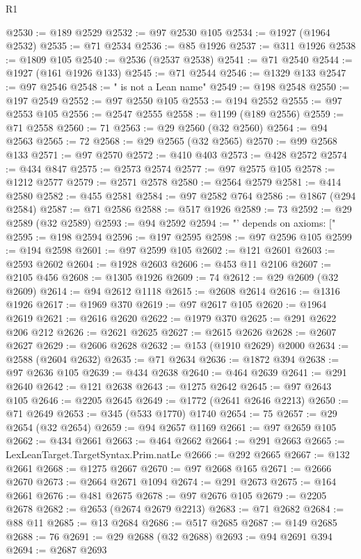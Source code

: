 \begin{lexlean}{R1}
\begin{coremodule}
{{{{{{{{{{{{{{{{{{{{{{{{{{{{{{{{{{{{{{{{{{{{{{{{{{{{{{{{{{{{{{{{{{{{{{{{{{{{{{{{{{{{{{{{{{{{{{{{{{{{{{{{{{{{{{{{{{{{{{{{{{{{{{{{{{{{{{{{{{{{{{{{{{{{{{{{{{{{{{{{{{{{{{{{{{{{{{{{{{{{{{{{{{@2530 := @189 @2529
@2532 := @97 @2530 @105
@2534 := @1927 (@1964 @2532)
@2535 := @71 @2534
@2536 := @85 @1926
@2537 := @311 @1926
@2538 := @1809 @105
@2540 := @2536 (@2537 @2538)
@2541 := @71 @2540
@2544 := @1927 (@161 @1926 @133)
@2545 := @71 @2544
@2546 := @1329 @133
@2547 := @97 @2546
@2548 := " is not a Lean name"
@2549 := @198 @2548
@2550 := @197 @2549
@2552 := @97 @2550 @105
@2553 := @194 @2552
@2555 := @97 @2553 @105
@2556 := @2547 @2555
@2558 := @1199 (@189 @2556)
@2559 := @71 @2558
@2560 := 71
@2563 := @29 @2560 (@32 @2560)
@2564 := @94 @2563
@2565 := 72
@2568 := @29 @2565 (@32 @2565)
@2570 := @99 @2568 @133
@2571 := @97 @2570
@2572 := @410 @403
@2573 := @428 @2572
@2574 := @434 @847
@2575 := @2573 @2574
@2577 := @97 @2575 @105
@2578 := @1212 @2577
@2579 := @2571 @2578
@2580 := @2564 @2579
@2581 := @414 @2580
@2582 := @455 @2581
@2584 := @97 @2582 @764
@2586 := @1867 (@294 @2584)
@2587 := @71 @2586
@2588 := @517 @1926
@2589 := 73
@2592 := @29 @2589 (@32 @2589)
@2593 := @94 @2592
@2594 := "' depends on axioms: ["
@2595 := @198 @2594
@2596 := @197 @2595
@2598 := @97 @2596 @105
@2599 := @194 @2598
@2601 := @97 @2599 @105
@2602 := @121 @2601
@2603 := @2593 @2602
@2604 := @1928 @2603
@2606 := @453 @11 @2106
@2607 := @2105 @456
@2608 := @1305 @1926
@2609 := 74
@2612 := @29 @2609 (@32 @2609)
@2614 := @94 @2612 @1118
@2615 := @2608 @2614
@2616 := @1316 @1926
@2617 := @1969 @370
@2619 := @97 @2617 @105
@2620 := @1964 @2619
@2621 := @2616 @2620
@2622 := @1979 @370
@2625 := @291 @2622 @206 @212
@2626 := @2621 @2625
@2627 := @2615 @2626
@2628 := @2607 @2627
@2629 := @2606 @2628
@2632 := @153 (@1910 @2629) @2000
@2634 := @2588 (@2604 @2632)
@2635 := @71 @2634
@2636 := @1872 @394
@2638 := @97 @2636 @105
@2639 := @434 @2638
@2640 := @464 @2639
@2641 := @291 @2640
@2642 := @121 @2638
@2643 := @1275 @2642
@2645 := @97 @2643 @105
@2646 := @2205 @2645
@2649 := @1772 (@2641 @2646 @2213)
@2650 := @71 @2649
@2653 := @345 (@533 @1770) @1740
@2654 := 75
@2657 := @29 @2654 (@32 @2654)
@2659 := @94 @2657 @1169
@2661 := @97 @2659 @105
@2662 := @434 @2661
@2663 := @464 @2662
@2664 := @291 @2663
@2665 := LexLeanTarget.TargetSyntax.Prim.natLe
@2666 := @292 @2665
@2667 := @132 @2661
@2668 := @1275 @2667
@2670 := @97 @2668 @165
@2671 := @2666 @2670
@2673 := @2664 @2671 @1094
@2674 := @291 @2673
@2675 := @164 @2661
@2676 := @481 @2675
@2678 := @97 @2676 @105
@2679 := @2205 @2678
@2682 := @2653 (@2674 @2679 @2213)
@2683 := @71 @2682
@2684 := @88 @11
@2685 := @13 @2684
@2686 := @517 @2685
@2687 := @149 @2685
@2688 := 76
@2691 := @29 @2688 (@32 @2688)
@2693 := @94 @2691 @394
@2694 := @2687 @2693
}}}}}}}}}}}}}}}}}}}}}}}}}}}}}}}}}}}}}}}}}}}}}}}}}}}}}}}}}}}}}}}}}}}}}}}}}}}}}}}}}}}}}}}}}}}}}}}}}}}}}}}}}}}}}}}}}}}}}}}}}}}}}}}}}}}}}}}}}}}}}}}}}}}}}}}}}}}}}}}}}}}}}}}}}}}}}}}}}}}}}}}}}}
\end{coremodule}
\end{lexlean}
